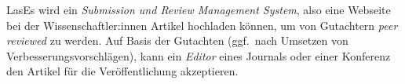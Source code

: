 
LasEs wird ein \emph{Submission und Review Management System}, also eine Webseite bei der Wissenschaftler:innen Artikel hochladen können, um von Gutachtern \emph{peer reviewed} zu werden.
Auf Basis der Gutachten (ggf.\ nach Umsetzen von Verbesserungsvorschlägen), kann ein \emph{Editor} eines Journals oder einer Konferenz den Artikel für die Veröffentlichung akzeptieren.
